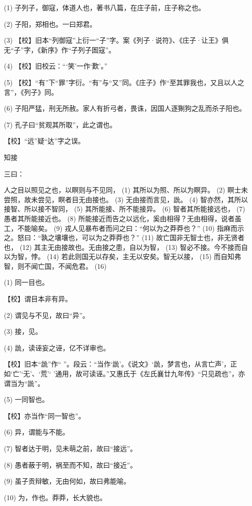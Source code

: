 \documentclass[12pt,UTF8]{ctexbook}
\begin{document}
(1) 子列子，御寇，体道人也，著书八篇，在庄子前，庄子称之也。

(2) 子阳，郑相也。一曰郑君。

(3) 【校】旧本“列御寇”上衍一“子”字。案《列子·说符》、《庄子·让王》俱无“子”字，《新序》作“子列子圄寇”。

(4) 【校】旧校云：“‘笑’一作‘歎’。”

(5) 【校】“有”下“罪”字衍。“有”与“又”同。《庄子》作“至其罪我也，又且以人之言”，《列子》同。

(6) 子阳严猛，刑无所赦。家人有折弓者，畏诛，因国人逐猘狗之乱而杀子阳也。

(7) 孔子曰“贫观其所取”，此之谓也。

【校】“远”疑“达”字之误。





知接


三曰：

人之目以照见之也，以瞑则与不见同， (1) 其所以为照、所以为瞑异。 (2) 瞑士未尝照，故未尝见，瞑者目无由接也。 (3) 无由接而言见，詤。 (4) 智亦然，其所以接智、所以接不智同， (5) 其所能接、所不能接异。 (6) 智者其所能接远也， (7) 愚者其所能接近也。 (8) 所能接近而告之以远化，奚由相得？无由相得，说者虽工，不能喻矣。 (9) 戎人见暴布者而问之曰：“何以为之莽莽也？” (10) 指麻而示之。怒曰：“孰之壤壤也，可以为之莽莽也？” (11) 故亡国非无智士也，非无贤者也， (12) 其主无由接故也。无由接之患，自以为智， (13) 智必不接。今不接而自以为智，悖。 (14) 若此则国无以存矣，主无以安矣。智无以接， (15) 而自知弗智，则不闻亡国，不闻危君。 (16)

(1) 同一目也。

【校】谓目本非有异。

(2) 谓见与不见，故曰“异”。

(3) 接，见。

(4) 詤，读诬妄之诬，亿不详审也。

【校】旧本“詤”作“ ”。段云：“当作‘詤’。《说文》‘詤，梦言也，从言亡声’，正如‘亡’‘无’、‘荒’‘ ’通用，故可读诬。”又惠氏于《左氏襄廿九年传》“只见疏也”，亦谓当为“詤”。

(5) 一同智也。

【校】亦当作“同一智也”。

(6) 异，谓能与不能。

(7) 智者达于明，见未萌之前，故曰“接远”。

(8) 愚者蔽于明，祸至而不知，故曰“接近”。

(9) 虽子贡辩敏，无由何如，故曰弗能喻。

(10) 为，作也。莽莽，长大貌也。
\end{document}
